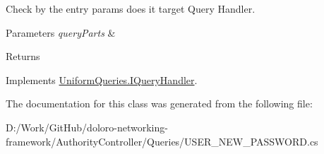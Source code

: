 Check by the entry params does it target Query Handler. 


\begin{DoxyParams}{Parameters}
{\em query\+Parts} & \\
\hline
\end{DoxyParams}
\begin{DoxyReturn}{Returns}

\end{DoxyReturn}


Implements \mbox{\hyperlink{interface_uniform_queries_1_1_i_query_handler_abda1ccf47ad2889fbd015955965046e7}{Uniform\+Queries.\+I\+Query\+Handler}}.



The documentation for this class was generated from the following file\+:\begin{DoxyCompactItemize}
\item 
D\+:/\+Work/\+Git\+Hub/doloro-\/networking-\/framework/\+Authority\+Controller/\+Queries/U\+S\+E\+R\+\_\+\+N\+E\+W\+\_\+\+P\+A\+S\+S\+W\+O\+R\+D.\+cs\end{DoxyCompactItemize}
